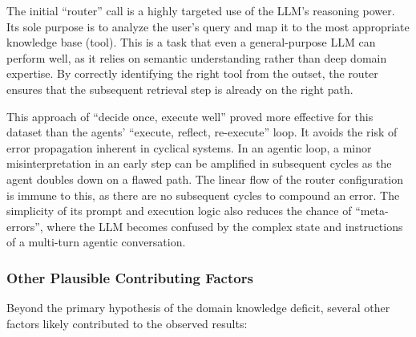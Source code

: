             The initial ``router'' call is a highly targeted use of the LLM's reasoning power. Its sole purpose is to analyze the user's query and map it to the most appropriate knowledge base (tool). This is a task that even a general-purpose LLM can perform well, as it relies on semantic understanding rather than deep domain expertise. By correctly identifying the right tool from the outset, the router ensures that the subsequent retrieval step is already on the right path.
            
            This approach of ``decide once, execute well'' proved more effective for this dataset than the agents' ``execute, reflect, re-execute'' loop. It avoids the risk of error propagation inherent in cyclical systems. In an agentic loop, a minor misinterpretation in an early step can be amplified in subsequent cycles as the agent doubles down on a flawed path. The linear flow of the router configuration is immune to this, as there are no subsequent cycles to compound an error. The simplicity of its prompt and execution logic also reduces the chance of ``meta-errors'', where the LLM becomes confused by the complex state and instructions of a multi-turn agentic conversation.
        
        \subsubsection{Other Plausible Contributing Factors}
        
            Beyond the primary hypothesis of the domain knowledge deficit, several other factors likely contributed to the observed results:
            
